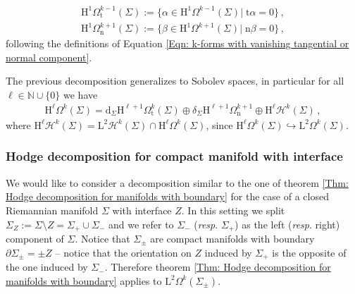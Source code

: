 \begin{theorem}
\begin{enumerate}
		\begin{align}\label{Eqn: Dirichlet and Neumann forms}
			\mathrm{H}^1\Omega^{k-1}_{\mathrm{t}}(\Sigma):=\lbrace\alpha\in \mathrm{H}^1\Omega^{k-1}(\Sigma)|\;\mathrm{t}\alpha=0\rbrace\,,\\
			\mathrm{H}^1\Omega^{k+1}_{\mathrm{n}}(\Sigma):=\lbrace\beta\in \mathrm{H}^1\Omega^{k+1}(\Sigma)|\;\mathrm{n}\beta=0\rbrace\,,
		\end{align}
	following the definitions of Equation \eqref{Eqn: k-forms with vanishing tangential or normal component}.
	\end{enumerate}
\end{theorem}
\begin{remark}
		The previous decomposition generalizes to Sobolev spaces, in particular for all $\ell\in\mathbb{N}\cup\{0\}$ we have
		\begin{align}\label{Eqn: Hodge decomposition for manifold with boundary for Sobolev spaces}
			\mathrm{H}^\ell\Omega^k(\Sigma)=\mathrm{d}_\Sigma \mathrm{H}^{\ell+1}\Omega^k_{\mathrm{t}}(\Sigma)\oplus\delta_\Sigma \mathrm{H}^{\ell+1}\Omega^{k+1}_{\mathrm{n}}\oplus
			\mathrm{H}^\ell \mathcal{H}^k(\Sigma)\,,		
		\end{align}
		where $\mathrm{H}^\ell \mathcal{H}^k(\Sigma)=\mathrm{L}^2\mathcal{H}^k(\Sigma)\cap\mathrm{H}^\ell\Omega^k(\Sigma)$, since $\mathrm{H}^\ell\Omega^k(\Sigma)\hookrightarrow\mathrm{L}^2\Omega^k(\Sigma)$.
\end{remark}


\subsubsection{Hodge decomposition for compact manifold with interface}
We would like to consider a decomposition similar to the one of theorem \ref{Thm: Hodge decomposition for manifolds with boundary} for the case of a closed Riemannian manifold $\Sigma$ with interface $Z$.
In this setting we split $\Sigma_Z:=\Sigma\setminus Z=\Sigma_+\cup \Sigma_-$ and we refer to $\Sigma_-$ (\textit{resp}. $\Sigma_+$) as the left (\textit{resp}. right) component of $\Sigma$.
Notice that $\Sigma_\pm$ are compact manifolds with boundary $\partial \Sigma_\pm=\pm Z$ -- notice that the orientation on $Z$ induced by $\Sigma_+$ is the opposite of the one induced by $\Sigma_-$.
Therefore theorem \ref{Thm: Hodge decomposition for manifolds with boundary} applies to $\mathrm{L}^2\Omega^k(\Sigma_\pm)$.

